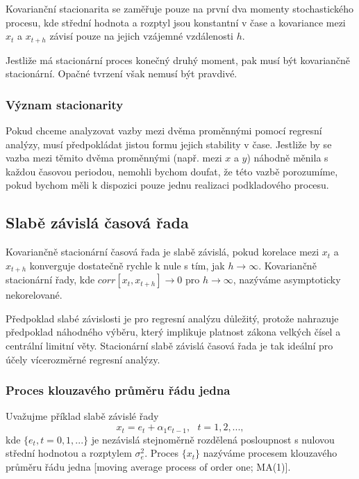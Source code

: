Kovarianční stacionarita se zaměřuje pouze na první dva momenty 
stochastického procesu, kde střední hodnota a rozptyl jsou 
konstantní v čase a kovariance mezi $x_t$ a $x_{t + h}$ závisí 
pouze na jejich vzájemné vzdálenosti $h$.

Jestliže má stacionární proces konečný druhý moment, pak musí 
být kovariančně stacionární. Opačné tvrzení však nemusí být pravdivé.

\subsubsection{Význam stacionarity}

Pokud chceme analyzovat vazby mezi dvěma proměnnými pomocí 
regresní analýzy, musí předpokládat jistou formu jejich stability v 
čase. Jestliže by se vazba mezi těmito dvěma proměnnými (např. mezi $x$ a 
$y$) náhodně měnila s každou časovou periodou, nemohli bychom 
doufat, že této vazbě porozumíme, pokud bychom měli k dispozici 
pouze jednu realizaci podkladového procesu.

\subsection{Slabě závislá časová řada}

Kovariančně stacionární časová 
řada je slabě závislá, pokud korelace mezi $x_t$ a $x_{t + h}$ 
konverguje dostatečně rychle k nule s tím, jak $h \rightarrow \infty$.
Kovariančně stacionární řady, kde $corr[x_t, x_{t+h}] \rightarrow 
0$ pro $h \rightarrow \infty$, nazýváme asymptoticky nekorelované.

Předpoklad slabé závislosti je pro regresní analýzu důležitý, 
protože nahrazuje předpoklad náhodného výběru, který implikuje 
platnost zákona velkých čísel a centrální limitní věty. 
Stacionární slabě závislá časová řada je tak ideální pro 
účely vícerozměrné regresní analýzy.

\subsubsection{Proces klouzavého průměru řádu jedna}

Uvažujme příklad slabě závislé řady
\begin{equation}
x_t = e_t + \alpha_1 e_{t - 1}, ~~~ t = 1, 2, ...,
\end{equation}
kde $\{e_t, t = 0, 1, ...\}$ je nezávislá stejnoměrně rozdělená 
posloupnost s nulovou střední hodnotou a rozptylem $\sigma^2_e$. 
Proces $\{x_t\}$ nazýváme procesem klouzavého průměru řádu jedna 
[moving average process of order one; MA(1)].

